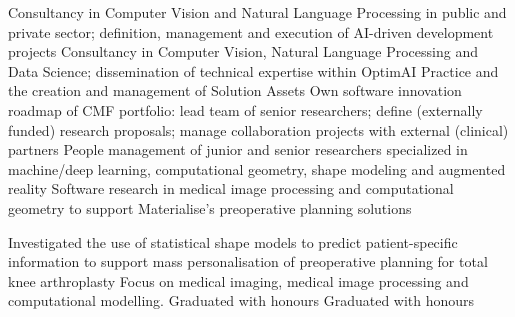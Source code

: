 \documentclass[
	a4paper,
	sidesectionsize=Large,
	maincolor=cvprimary,
	sectioncolor=cvprimary,
	sidecolor=cvprimary!10,
	topbottommargin=0.02\paperheight,
	leftrightmargin=0.02\paperwidth,
	profilepiczoom=1.6,
	profilepicxshift=-1mm,
	profilepicyshift=-7mm,
	profilepicrounding=0.5cm,
]{fortysecondscv}
\begin{document}
\makefrontsidebar
\newlength{\firstpagespacing}
\setlength{\firstpagespacing}{2ex}

\vspace{\firstpagespacing}
\vspace*{-1ex}
\begin{cvtable}[3.5]
	{Consultancy in Computer Vision and Natural Language Processing in public and private sector; definition, management and execution of AI-driven development projects}
	{Consultancy in Computer Vision, Natural Language Processing and Data Science; dissemination of technical expertise within OptimAI Practice and the creation and management of Solution Assets}
	{Own software innovation roadmap of CMF portfolio: lead team of senior researchers; define (externally funded) research proposals; manage collaboration projects with external (clinical) partners}
	{People management of junior and senior researchers specialized in machine/deep learning, computational geometry, shape modeling and augmented reality}
	{Software research in medical image processing and computational geometry to support Materialise's preoperative planning solutions}
\end{cvtable}

\vspace{\firstpagespacing}
\vspace*{-1ex}
\begin{cvtable}[3.5]
	{Investigated the use of statistical shape models to predict patient-specific information to support mass personalisation of preoperative planning for total knee arthroplasty}
		{Focus on medical imaging, medical image processing and computational modelling. Graduated with honours}
		{Graduated with honours}
\end{cvtable}
\end{document}

